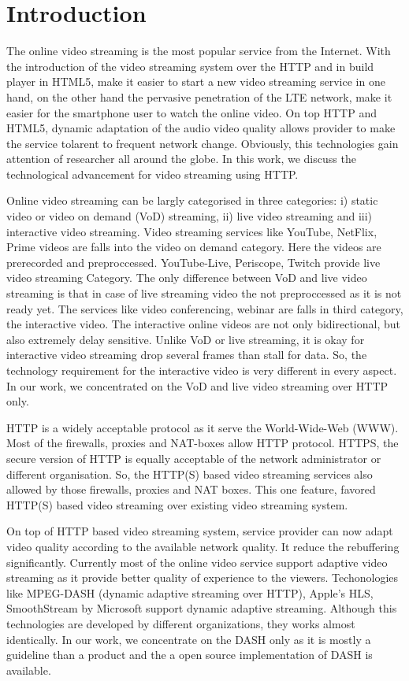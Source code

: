 \section{Introduction}
The online video streaming is the most popular service from the Internet. With the introduction of the video streaming system over the HTTP and in build player in HTML5, make it easier to start a new video streaming service in one hand, on the other hand the pervasive penetration of the LTE network, make it easier for the smartphone user to watch the online video. On top HTTP and HTML5, dynamic adaptation of the audio video quality allows provider to make the service tolarent to frequent network change. Obviously, this technologies gain attention of researcher all around the globe. In this work, we discuss the technological advancement for video streaming using HTTP.

Online video streaming can be largly categorised in three categories: i) static video or video on demand (VoD) streaming, ii) live video streaming and iii) interactive video streaming. Video streaming services like YouTube, NetFlix, Prime videos are falls into the video on demand category. Here the videos are prerecorded and preproccessed. YouTube-Live, Periscope, Twitch provide live video streaming Category. The only difference between VoD and live video streaming is that in case of live streaming video the not preproccessed as it is not ready yet. The services like video conferencing, webinar are falls in third category, the interactive video. The interactive online videos are not only bidirectional, but also extremely delay sensitive. Unlike VoD or live streaming, it is okay for interactive video streaming drop several frames than stall for data. So, the technology requirement for the interactive video is very different in every aspect. In our work, we concentrated on the VoD and live video streaming over HTTP only.

HTTP is a widely acceptable protocol as it serve the World-Wide-Web (WWW). Most of the firewalls, proxies and NAT-boxes allow HTTP protocol. HTTPS, the secure version of HTTP is equally acceptable of the network administrator or different organisation. So, the HTTP(S) based video streaming services also allowed by those firewalls, proxies and NAT boxes. This one feature, favored HTTP(S) based video streaming over existing video streaming system.

On top of HTTP based video streaming system, service provider can now adapt video quality according to the available network quality. It reduce the rebuffering significantly. Currently most of the online video service support adaptive video streaming as it provide better quality of experience to the viewers. Techonologies like MPEG-DASH (dynamic adaptive streaming over HTTP), Apple's HLS, SmoothStream by Microsoft support dynamic adaptive streaming. Although this technologies are developed by different organizations, they works almost identically. In our work, we concentrate on the DASH only as it is mostly a guideline than a product and the a open source implementation of DASH is available.


